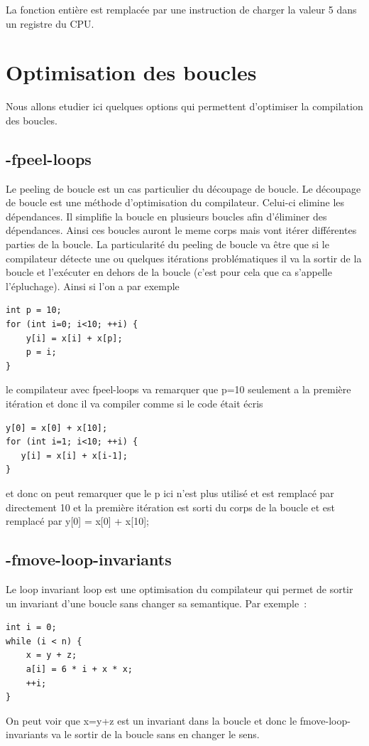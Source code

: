 \documentclass[11pt]{article} %
\begin{document}
La fonction enti\`ere est remplac\'ee par une instruction de charger la valeur 5 dans un registre du CPU.


\section*{Optimisation des boucles}

Nous allons etudier ici quelques options qui permettent d’optimiser la compilation des boucles.


\subsection*{-fpeel-loops}
Le peeling de boucle est un cas particulier du découpage de boucle. Le découpage de boucle est une méthode d’optimisation du compilateur.
Celui-ci elimine les dépendances. Il simplifie la boucle en plusieurs boucles afin d’éliminer des dépendances. Ainsi ces boucles auront le
meme corps mais vont itérer différentes parties de la boucle. La particularité du peeling de boucle va être que si le compilateur détecte
une ou quelques itérations problématiques il va la sortir de la boucle et l’exécuter en dehors de la boucle (c’est pour cela que ca s’appelle
l’épluchage). Ainsi si l’on a par exemple 
\begin{verbatim}
int p = 10;
for (int i=0; i<10; ++i) {
    y[i] = x[i] + x[p];
    p = i;
}
\end{verbatim}
le compilateur avec fpeel-loops va remarquer que p=10 seulement a la première itération et donc il va compiler comme si le code était écris
\begin{verbatim}
y[0] = x[0] + x[10];
for (int i=1; i<10; ++i) {
   y[i] = x[i] + x[i-1];
}
\end{verbatim}
et donc on peut remarquer que le p ici n’est plus utilisé et est remplacé par directement 10 et la première
itération est sorti du corps de la boucle et est remplacé par y[0] = x[0] + x[10];

\subsection*{-fmove-loop-invariants}
Le loop invariant loop est une optimisation du compilateur qui permet de sortir un invariant d’une boucle sans changer sa semantique. Par exemple :

\begin{verbatim}
int i = 0;
while (i < n) {
    x = y + z;
    a[i] = 6 * i + x * x;
    ++i;
}
\end{verbatim}
On peut voir que x=y+z est un invariant dans la boucle et donc le fmove-loop-invariants va le sortir
 de la boucle sans en changer le sens.
\end{document}
